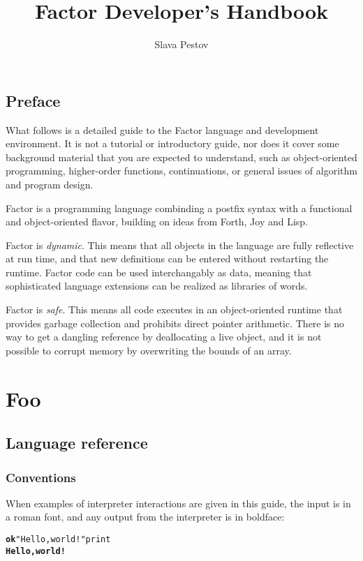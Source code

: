 \documentclass{book}
\begin{document}
\title{Factor Developer's Handbook}

\author{Slava Pestov}

\maketitle
\tableofcontents{}

\chapter*{Preface}

What follows is a detailed guide to the Factor language and development environment. It is not a tutorial or introductory guide, nor does it cover some background material that you are expected to understand, such as object-oriented programming, higher-order functions, continuations, or general issues of algorithm and program design.

Factor is a programming language combinding a postfix syntax with a functional and object-oriented
flavor, building on ideas from Forth, Joy and Lisp.

Factor is \emph{dynamic}. This means that all objects in the language are fully reflective at run time, and that new definitions can be entered without restarting the runtime. Factor code can be used interchangably as data, meaning that sophisticated language extensions can be realized as libraries of words.

Factor is \emph{safe}. This means all code executes in an object-oriented runtime that provides
garbage collection and prohibits direct pointer arithmetic. There is no way to get a dangling reference by deallocating a live object, and it is not possible to corrupt memory by overwriting the bounds of an array.

\part{Foo}

\chapter{Language reference}

\section{Conventions}

When examples of interpreter interactions are given in this guide, the input is in a roman font, and any
output from the interpreter is in boldface:
\begin{alltt}
\textbf{ok} "Hello, world!" print
\textbf{Hello, world!}
\end{alltt}
\end{document}
